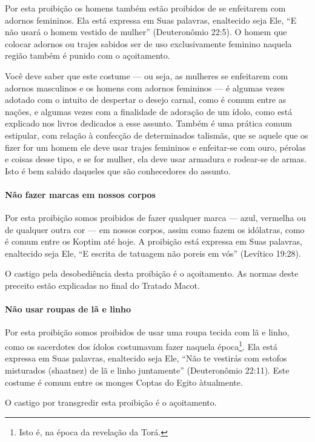 Por esta proibição os homens também estão proibidos de se enfeitarem
com adornos femininos. Ela está expressa em Suas palavras, enaltecido
seja Ele, ``E não usará o homem vestido de mulher'' (Deuteronômio
22:5). O homem que colocar adornos ou trajes sabidos ser de uso
exclusivamente feminino naquela região também é punido com o
açoitamento.

Você deve saber que este costume --- ou seja, as mulheres se enfeitarem
com adornos masculinos e os homens com adornos femininos --- é algumas
vezes adotado com o intuito de despertar o desejo carnal, como é comum
entre as nações, e algumas vezes com a finalidade de adoração de um
ídolo, como está explicado nos livros dedicados a esse assunto. Também é
uma prática comum estipular, com relação à confecção de determinados
talismãs, que se aquele que os fizer for um homem ele deve usar trajes
femininos e enfeitar-se com ouro, pérolas e coisas desse tipo, e se for
mulher, ela deve usar armadura e rodear-se de armas. Isto é bem sabido
daqueles que são conhecedores do assunto.

\paragraph{Não fazer marcas em nossos corpos}

Por esta proibição somos proibidos de fazer qualquer marca --- azul,
vermelha ou de qualquer outra cor --- em nossos corpos, assim como fazem
os idólatras, como é comum entre os Koptim até hoje. A proibição está
expressa em Suas palavras, enaltecido seja Ele, ``E escrita de tatuagem
não poreis em vós'' (Levítico 19:28).

O castigo pela desobediência desta proibição é o açoitamento. As normas
deste preceito estão explicadas no final do Tratado Macot.

\paragraph{Não usar roupas de lã e linho}

Por esta proibição somos proibidos de usar uma roupa tecida com lã e
linho, como os sacerdotes dos ídolos costumavam fazer naquela
época\footnote{Isto é, na época da revelação da Torá.}. Ela está expressa em Suas palavras,
enaltecido seja Ele, ``Não te vestirás com estofos misturados (shaatnez)
de lã e linho juntamente'' (Deuteronômio 22:11). Este costume é comum
entre os monges Coptas do Egito àtualmente.

O castigo por transgredir esta proibição é o açoitamento.

